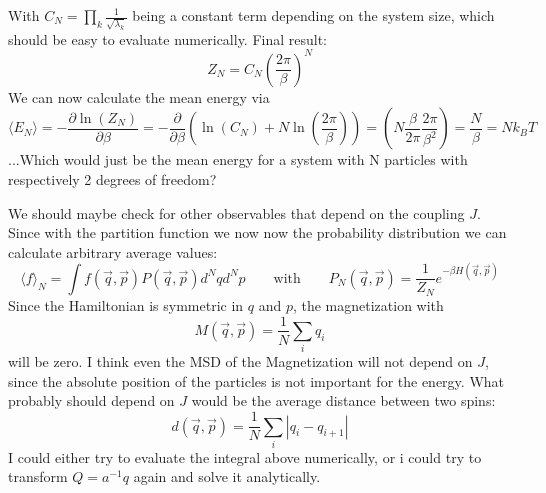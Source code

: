 	With $C_N =	\prod_k \frac{1}{\sqrt{\lambda_k}}$ being a constant term depending on the system size, which should be easy to evaluate numerically. Final result:
	\begin{equation}
		Z_N =	C_N  \left(\frac{2 \pi}{\beta}\right)^{N}
	\end{equation}
	We can now calculate the mean energy via
	\begin{equation}
		\langle E_N \rangle =	- \frac{\partial \ln (Z_N)}{\partial \beta} =	- \frac{\partial}{\partial \beta} \left(\ln(C_N) + N \ln \left(\frac{2 \pi }{\beta}\right)\right) = \left( N	\frac{\beta}{2 \pi} \frac{2\pi}{\beta^2}\right) =	\frac{N}{\beta} =	N k_B T
	\end{equation}
	...Which would just be the mean energy for a system with N	particles with respectively 2 degrees of freedom?
	
	We should maybe check for other observables that depend on the coupling $J$. Since with the partition function we now now the probability distribution we can calculate arbitrary average values:
	\begin{equation}
		\langle f \rangle_N =	\int f(\vec{q}, \vec{p}) P(\vec{q}, \vec{p}) d^Nq d^Np \qquad \text{with} \qquad P_N(\vec{q}, \vec{p}) =	\frac{1}{Z_N} e^{-\beta H(\vec{q}, \vec{p})}
	\end{equation}
	Since the Hamiltonian is symmetric in $q$ and $p$, the magnetization with
	\begin{equation}
		M(\vec{q}, \vec{p}) = \frac{1}{N} \sum_i q_i
	\end{equation}
	will be zero. I	think even the MSD of the Magnetization will not depend on $J$, since the absolute position of the particles is not important for the energy. What probably should depend on $J$ would be the average distance between two spins:
	\begin{equation}
		d(\vec{q}, \vec{p}) =	\frac{1}{N} \sum_i |q_i - q_{i+ 1}|
	\end{equation}
	I could either try to evaluate the integral above numerically, or i could try to transform $Q = a^{-1} q$ again and solve it analytically.
